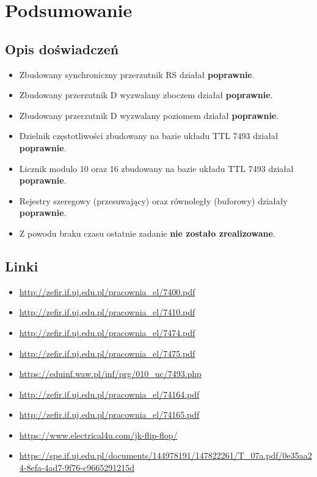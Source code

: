 \chapter{Podsumowanie}

\section{Opis doświadczeń}
\begin{itemize}
    \item Zbudowany synchroniczny przerzutnik RS działał \textbf{poprawnie}.
    \item Zbudowany przerzutnik D wyzwalany zboczem działał \textbf{poprawnie}.
    \item Zbudowany przerzutnik D wyzwalany poziomem działał \textbf{poprawnie}.
    \item Dzielnik częstotliwości zbudowany na bazie układu TTL 7493 działał \textbf{poprawnie}.
    \item Licznik modulo 10 oraz 16 zbudowany na bazie układu TTL 7493 działał \textbf{poprawnie}.
    \item Rejestry szeregowy (przesuwający) oraz równoległy (buforowy) działały \textbf{poprawnie}.
    \item Z powodu braku czasu ostatnie zadanie \textbf{nie zostało zrealizowane}.
\end{itemize}

\section{Linki}

\begin{itemize}
    \item \label{link:7400} \url{http://zefir.if.uj.edu.pl/pracownia_el/7400.pdf}
    \item \label{link:7410} \url{http://zefir.if.uj.edu.pl/pracownia_el/7410.pdf}
    \item \label{link:7474} \url{http://zefir.if.uj.edu.pl/pracownia_el/7474.pdf}
    \item \label{link:7475} \url{http://zefir.if.uj.edu.pl/pracownia_el/7475.pdf}
    \item \label{link:7493} \url{https://eduinf.waw.pl/inf/prg/010_uc/7493.php}
    \item \label{link:74164} \url{http://zefir.if.uj.edu.pl/pracownia_el/74164.pdf}
    \item \label{link:74165} \url{http://zefir.if.uj.edu.pl/pracownia_el/74165.pdf}
    \item \label{link:JK} \url{https://www.electrical4u.com/jk-flip-flop/}
    \item \label{link:wyklad} \url{https://spe.if.uj.edu.pl/documents/144978191/147822261/T_07a.pdf/0e35aa24-8efa-4ad7-9f76-c9665291215d}
\end{itemize}